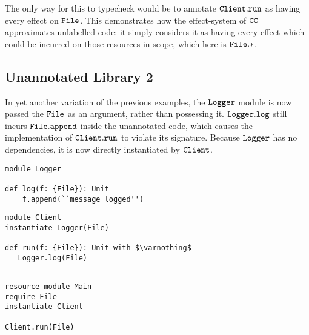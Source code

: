 The only way for this to typecheck would be to annotate $\mathtt{Client.run}$ as having every effect on $\mathtt{File}$. This demonstrates how the effect-system of $\mathtt{CC}$ approximates unlabelled code: it simply considers it as having every effect which could be incurred on those resources in scope, which here is $\mathtt{File}.*$.



































\subsection{Unannotated Library 2}

In yet another variation of the previous examples, the $\mathtt{Logger}$ module is now passed the $\mathtt{File}$ as an argument, rather than possessing it. $\mathtt{Logger.log}$ still incurs $\mathtt{File.append}$ inside the unannotated code, which causes the implementation of $\mathtt{Client.run}$ to violate its signature. Because $\mathtt{Logger}$ has no dependencies, it is now directly instantiated by $\mathtt{Client}$.

\begin{lstlisting}
module Logger

def log(f: {File}): Unit
    f.append(``message logged'')
\end{lstlisting}

\begin{lstlisting}
module Client
instantiate Logger(File)

def run(f: {File}): Unit with $\varnothing$
   Logger.log(File)
   
\end{lstlisting}

\begin{lstlisting}
resource module Main
require File
instantiate Client

Client.run(File)
\end{lstlisting}

